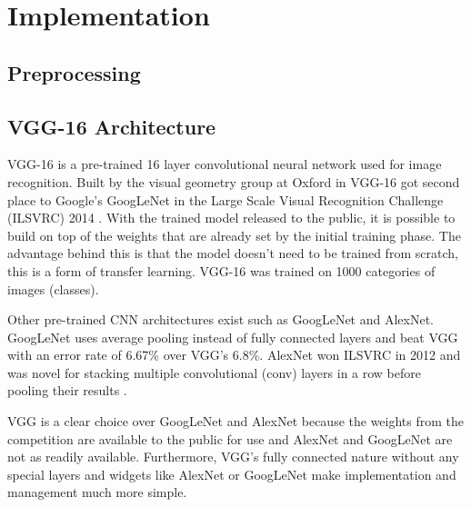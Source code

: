 \section{Implementation}


\subsection{Preprocessing}


\subsection{VGG-16 Architecture}

\newcommand{\anet}{AlexNet\xspace}
\newcommand{\gnet}{GoogLeNet\xspace}
\newcommand{\inet}{ImageNet\xspace}

VGG-16 is a pre-trained 16 layer convolutional neural network used for image recognition. Built by the visual geometry group at Oxford in \citeyear{vgg16-arxiv} VGG-16 got second place to Google's \gnet in the Large Scale Visual Recognition Challenge (ILSVRC) 2014 \cite{vgg16-arxiv}. With the trained model released to the public, it is possible to build on top of the weights that are already set by the initial training phase. The advantage behind this is that the model doesn't need to be trained from scratch, this is a form of transfer learning. VGG-16 was trained on 1000 categories of images (classes).

Other pre-trained CNN architectures exist such as \gnet and \anet. \gnet uses average pooling instead of fully connected layers \cite{googlenet-paper} and beat VGG with an error rate of 6.67\% over VGG's 6.8\%. \anet won ILSVRC in 2012 and was novel for stacking multiple convolutional (conv) layers in a row before pooling their results \cite{alexnet-paper}. %

VGG is a clear choice over \gnet and \anet because the weights from the competition are available to the public for use and \anet and \gnet are not as readily available. Furthermore, VGG's fully connected nature without any special layers and widgets like \anet or \gnet make implementation and management much more simple. %

